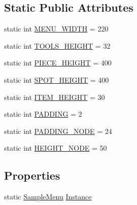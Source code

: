 \subsection*{Static Public Attributes}
\begin{DoxyCompactItemize}
\item 
static int \hyperlink{classgearit_1_1src_1_1_g_u_i_1_1sample_1_1_sample_menu_a41803ef4e68169f4ff046c70641b11ff}{M\+E\+N\+U\+\_\+\+W\+I\+D\+T\+H} = 220
\item 
static int \hyperlink{classgearit_1_1src_1_1_g_u_i_1_1sample_1_1_sample_menu_afc3a3042a82125953da5e8b359f9b850}{T\+O\+O\+L\+S\+\_\+\+H\+E\+I\+G\+H\+T} = 32
\item 
static int \hyperlink{classgearit_1_1src_1_1_g_u_i_1_1sample_1_1_sample_menu_a51f9a3551e62f368d196306e47e2e225}{P\+I\+E\+C\+E\+\_\+\+H\+E\+I\+G\+H\+T} = 400
\item 
static int \hyperlink{classgearit_1_1src_1_1_g_u_i_1_1sample_1_1_sample_menu_ace75860b9aac7bbc8a58e2210a28ce1c}{S\+P\+O\+T\+\_\+\+H\+E\+I\+G\+H\+T} = 400
\item 
static int \hyperlink{classgearit_1_1src_1_1_g_u_i_1_1sample_1_1_sample_menu_a000e44fb16a1c8f9b947c37956648b49}{I\+T\+E\+M\+\_\+\+H\+E\+I\+G\+H\+T} = 30
\item 
static int \hyperlink{classgearit_1_1src_1_1_g_u_i_1_1sample_1_1_sample_menu_ac4d8d25389a98db368d89c6767f7748d}{P\+A\+D\+D\+I\+N\+G} = 2
\item 
static int \hyperlink{classgearit_1_1src_1_1_g_u_i_1_1sample_1_1_sample_menu_addb93e22a0ee6f598b71e8a180e84a1a}{P\+A\+D\+D\+I\+N\+G\+\_\+\+N\+O\+D\+E} = 24
\item 
static int \hyperlink{classgearit_1_1src_1_1_g_u_i_1_1sample_1_1_sample_menu_aef06dec67a45182eab107d7ba746b1a0}{H\+E\+I\+G\+H\+T\+\_\+\+N\+O\+D\+E} = 50
\end{DoxyCompactItemize}
\subsection*{Properties}
\begin{DoxyCompactItemize}
\item 
static \hyperlink{classgearit_1_1src_1_1_g_u_i_1_1sample_1_1_sample_menu}{Sample\+Menu} \hyperlink{classgearit_1_1src_1_1_g_u_i_1_1sample_1_1_sample_menu_a6262d37ac72356bcd8e59bcb8f708dfb}{Instance}
\end{DoxyCompactItemize}


